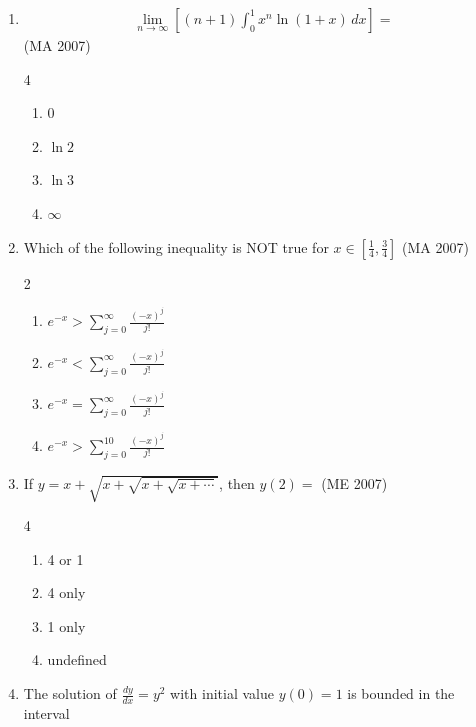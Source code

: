 \begin{enumerate}[label=\thesubsection.\arabic*,ref=\thesubsection.\theenumi]
\item 
\begin{align*}
\lim_{n \to \infty} \left[ (n+1) \int_0^1 x^n \ln(1+x) \, dx \right] =
\end{align*}
\hfill (MA 2007)
\begin{multicols}{4}
\begin{enumerate}
    \item 0
    \item $\ln 2$
    \item $\ln 3$
    \item $\infty$
\end{enumerate}
\end{multicols}


\item Which of the following inequality is NOT true for $x \in \left[ \frac{1}{4}, \frac{3}{4} \right]$
\hfill (MA 2007)
\begin{multicols}{2}
\begin{enumerate}
\item  $e^{-x} > \sum_{j=0}^{\infty} \frac{(-x)^j}{j!}$ \hspace{2cm}
\item $e^{-x} < \sum_{j=0}^{\infty} \frac{(-x)^j}{j!}$ \\
\item $e^{-x} = \sum_{j=0}^{\infty} \frac{(-x)^j}{j!}$ \hspace{2cm}
\item $e^{-x} > \sum_{j=0}^{10} \frac{(-x)^j}{j!}$
\end{enumerate}
\end{multicols}
\item If $ y = x + \sqrt{x + \sqrt{x + \sqrt{x + \cdots}}} $, then $ y(2) = $
\hfill (ME 2007)
\begin{multicols}{4}
\begin{enumerate}
\item 4 or 1
\item 4 only
\item 1 only
\item undefined
\end{enumerate}
\end{multicols}
\item The solution of $ \frac{dy}{dx} = y^2 $ with initial value $ y(0) = 1 $ is bounded in the interval


\end{enumerate}
